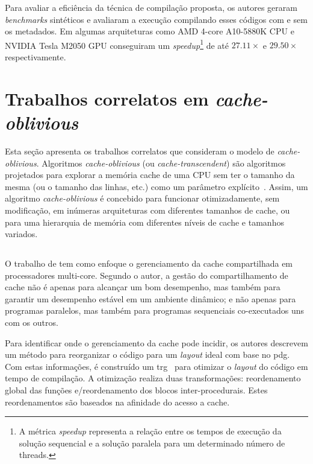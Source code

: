 Para avaliar a eficiência da técnica de compilação proposta, os autores geraram \textit{benchmarks} sintéticos e avaliaram a execução compilando esses códigos com e sem os metadados. Em algumas arquiteturas como AMD 4-core A10-5880K CPU e NVIDIA Tesla M2050 GPU conseguiram um \textit{speedup}\footnote{A métrica \textit{speedup} representa a relação entre os tempos de execução da solução sequencial e a solução paralela para um determinado número de threads.} de até $27.11 \times$ e $29.50 \times$ respectivamente.

\section{Trabalhos correlatos em \textit{cache-oblivious}}
\label{sec:trabalhos_cache_oblivous}

Esta seção apresenta os trabalhos correlatos que consideram o modelo de \textit{cache-oblivious}.
Algoritmos \textit{cache-oblivious} (ou \textit{cache-tran\-scen\-dent}) são algoritmos projetados para explorar a memória cache de uma CPU sem ter o tamanho da mesma (ou o tamanho das linhas, etc.) como um parâmetro explícito~\cite{frigo1999cache}. Assim, um algoritmo \textit{cache-oblivious} é concebido para funcionar otimizadamente, sem modificação, em inúmeras arquiteturas com diferentes tamanhos de cache, ou para uma hierarquia de memória com diferentes níveis de cache e tamanhos variados.

\subsection{}

O trabalho de  tem como enfoque o gerenciamento da cache compartilhada em processadores multi-core.
Segundo o autor, a gestão do compartilhamento de cache não é apenas para alcançar um bom desempenho, mas também para garantir um desempenho estável em um ambiente dinâmico; e não apenas para programas paralelos, mas também para programas sequenciais co-executados uns com os outros.

Para identificar onde o gerenciamento da cache pode incidir, os autores descrevem um método para reorganizar o código para um \textit{layout} ideal com base no \ac{pdg}.
Com estas informações, é construído um \ac{trg}~\cite{gloy1999procedure} para otimizar o \textit{layout} do código em tempo de compilação.
A otimização realiza duas transformações: reordenamento global das funções e\@/\@ou reordenamento dos blocos inter-procedurais. Estes reordenamentos são baseados na afinidade do acesso a cache.

